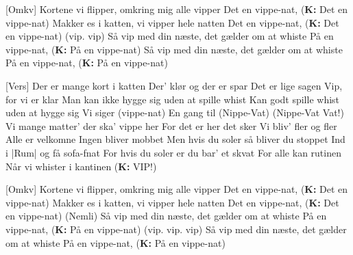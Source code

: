 \documentclass[a4paper,11pt]{article}
\begin{document}
\begin{song}
    [Omkv] Kortene vi flipper, omkring mig alle vipper
                Det en vippe-nat, (\textbf{K:} Det en vippe-nat)
                Makker es i katten, vi vipper hele natten
                Det en vippe-nat, (\textbf{K:} Det en vippe-nat) (vip. vip)
                Så vip med din næste, det gælder om at whiste
                På en vippe-nat, (\textbf{K:} På en vippe-nat) 
                Så vip med din næste, det gælder om at whiste
                På en vippe-nat, (\textbf{K:} På en vippe-nat)

    [Vers] Der er mange kort i katten
                Der' klør og der er spar
                Det er lige sagen
                Vip, for vi er klar
                Man kan ikke hygge sig uden at spille whist
                Kan godt spille whist uden at hygge sig
                Vi siger (vippe-nat)
                En gang til 
                (Nippe-Vat)
                (Nippe-Vat Vat!)
                Vi mange matter' der ska' vippe her
                For det er her det sker
                Vi bliv' fler og fler
                Alle er velkomne
                Ingen bliver mobbet
                Men hvis du soler så bliver du stoppet
                Ind i |Rum| og få sofa-fnat
                For hvis du soler er du bar' et skvat
                For alle kan rutinen 
                Når vi whister i kantinen  (\textbf{K:} VIP!)

    [Omkv] Kortene vi flipper, omkring mig alle vipper
                Det en vippe-nat, (\textbf{K:} Det en vippe-nat)
                Makker es i katten, vi vipper hele natten
                Det en vippe-nat, (\textbf{K:} Det en vippe-nat) (Nemli)
                Så vip med din næste, det gælder om at whiste
                På en vippe-nat, (\textbf{K:} På en vippe-nat) (vip. vip. vip)
                Så vip med din næste, det gælder om at whiste
                På en vippe-nat, (\textbf{K:} På en vippe-nat)
    
\end{song}
\end{document}

